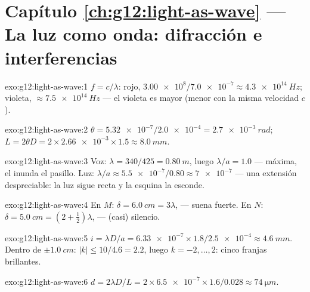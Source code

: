 \section*{Capítulo \ref{ch:g12:light-as-wave} --- La luz como onda: difracción e interferencias}

\begin{solution}{exo:g12:light-as-wave:1}
$f = c/\lambda$: rojo, $\num{3.00e8}/\num{7.0e-7} \approx
\qty{4.3e14}{Hz}$; violeta, $\approx \qty{7.5e14}{Hz}$ --- el violeta es
mayor (menor  con la misma velocidad $c$).
\end{solution}

\begin{solution}{exo:g12:light-as-wave:2}
$\theta = \num{5.32e-7}/\num{2.0e-4} = \qty{2.7e-3}{rad}$;
$L = 2\theta D = 2 \times \num{2.66e-3} \times 1.5 \approx
\qty{8.0}{mm}$.
\end{solution}

\begin{solution}{exo:g12:light-as-wave:3}
Voz: $\lambda = 340/425 = \qty{0.80}{m}$, luego $\lambda/a = 1.0$ ---
 máxima, el  inunda el pasillo. Luz:
$\lambda/a \approx \num{5.5e-7}/0.80 \approx \num{7e-7}$ --- una
extensión despreciable: la luz sigue recta y la esquina la esconde.
\end{solution}

\begin{solution}{exo:g12:light-as-wave:4}
En $M$: $\delta = \qty{6.0}{cm} = 3\lambda$,  --- suena
fuerte. En $N$: $\delta = \qty{5.0}{cm} = (2 + \tfrac12)\lambda$,
 --- (casi) silencio.
\end{solution}

\begin{solution}{exo:g12:light-as-wave:5}
$i = \lambda D/a = \num{6.33e-7} \times 1.8/\num{2.5e-4} \approx
\qty{4.6}{mm}$. Dentro de $\pm\qty{1.0}{cm}$: $|k| \leq 10/4.6 = 2.2$,
luego $k = -2, \dots, 2$: cinco franjas brillantes.
\end{solution}

\begin{solution}{exo:g12:light-as-wave:6}
$d = 2\lambda D/L = 2 \times \num{6.5e-7} \times 1.6/0.028 \approx
\qty{74}{\micro m}$.
\end{solution}

